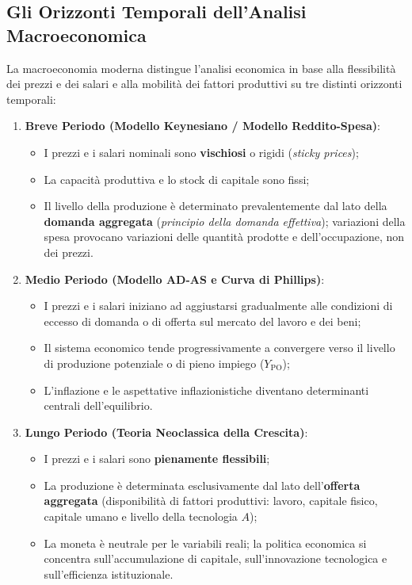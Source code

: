 \subsection{Gli Orizzonti Temporali dell'Analisi Macroeconomica}
La macroeconomia moderna distingue l'analisi economica in base alla flessibilità dei prezzi e dei salari e alla mobilità dei fattori produttivi su tre distinti orizzonti temporali:

\begin{enumerate}
    \item \textbf{Breve Periodo (Modello Keynesiano / Modello Reddito-Spesa)}:
    \begin{itemize}
        \item I prezzi e i salari nominali sono \textbf{vischiosi} o rigidi (\textit{sticky prices});
        \item La capacità produttiva e lo stock di capitale sono fissi;
        \item Il livello della produzione è determinato prevalentemente dal lato della \textbf{domanda aggregata} (\textit{principio della domanda effettiva}); variazioni della spesa provocano variazioni delle quantità prodotte e dell'occupazione, non dei prezzi.
    \end{itemize}
    
    \item \textbf{Medio Periodo (Modello AD-AS e Curva di Phillips)}:
    \begin{itemize}
        \item I prezzi e i salari iniziano ad aggiustarsi gradualmente alle condizioni di eccesso di domanda o di offerta sul mercato del lavoro e dei beni;
        \item Il sistema economico tende progressivamente a convergere verso il livello di produzione potenziale o di pieno impiego ($Y_{\mathrm{PO}}$);
        \item L'inflazione e le aspettative inflazionistiche diventano determinanti centrali dell'equilibrio.
    \end{itemize}
    
    \item \textbf{Lungo Periodo (Teoria Neoclassica della Crescita)}:
    \begin{itemize}
        \item I prezzi e i salari sono \textbf{pienamente flessibili};
        \item La produzione è determinata esclusivamente dal lato dell'\textbf{offerta aggregata} (disponibilità di fattori produttivi: lavoro, capitale fisico, capitale umano e livello della tecnologia $A$);
        \item La moneta è neutrale per le variabili reali; la politica economica si concentra sull'accumulazione di capitale, sull'innovazione tecnologica e sull'efficienza istituzionale.
    \end{itemize}
\end{enumerate}

